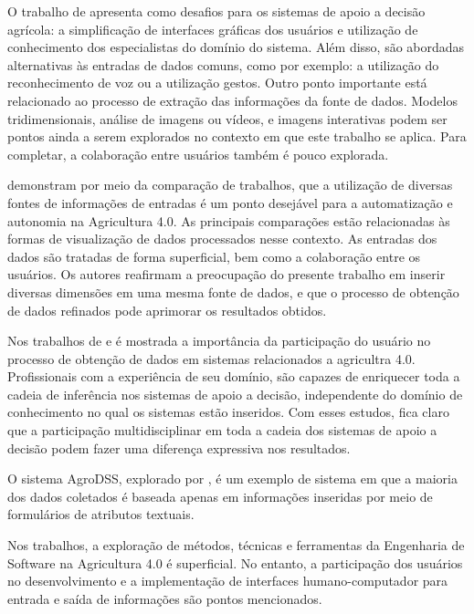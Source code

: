\documentclass[12pt]{article}
\begin{document}
O trabalho de  apresenta como desafios para os sistemas de apoio a decisão agrícola: a simplificação de interfaces gráficas dos usuários e utilização de conhecimento dos especialistas do domínio do sistema. Além disso, são abordadas alternativas às entradas de dados comuns, como por exemplo: a utilização do reconhecimento de voz ou a utilização gestos. Outro ponto importante está relacionado ao processo de extração das informações da fonte de dados. Modelos tridimensionais, análise de imagens ou vídeos, e imagens interativas podem ser pontos ainda a serem explorados no contexto em que este trabalho se aplica. Para completar, a colaboração entre usuários também é pouco explorada.

 demonstram por meio da comparação de trabalhos, que a utilização de diversas fontes de informações de entradas é um ponto desejável para a automatização e autonomia na Agricultura 4.0. As principais comparações estão relacionadas às formas de visualização de dados processados nesse contexto. As entradas dos dados são tratadas de forma superficial, bem como a colaboração entre os usuários. Os autores reafirmam a preocupação do presente trabalho em inserir diversas dimensões em uma mesma fonte de dados, e que o processo de obtenção de dados refinados pode aprimorar os resultados obtidos.

Nos trabalhos de  e  é mostrada a importância da participação do usuário no processo de obtenção de dados em sistemas relacionados a agricultra 4.0. Profissionais com a experiência de seu domínio, são capazes de enriquecer toda a cadeia de inferência nos sistemas de apoio a decisão, independente do domínio de conhecimento no qual os sistemas estão inseridos. Com esses estudos, fica claro que a participação multidisciplinar em toda a cadeia dos sistemas de apoio a decisão podem fazer uma diferença expressiva nos resultados.

O sistema AgroDSS, explorado por , é um exemplo de sistema em que a maioria dos dados coletados é baseada apenas em informações inseridas por meio de formulários de atributos textuais.

Nos trabalhos, a exploração de métodos, técnicas e ferramentas da Engenharia de Software na Agricultura 4.0 é superficial. No entanto, a participação dos usuários no desenvolvimento e a implementação de interfaces humano-computador para entrada e saída de informações são pontos mencionados.
\end{document}
